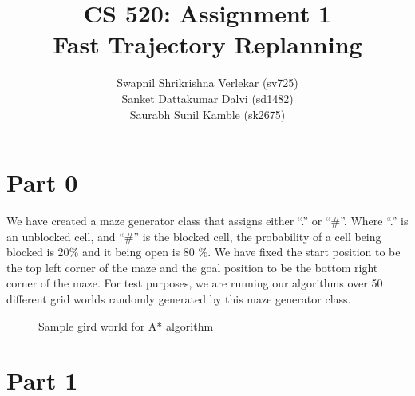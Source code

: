\documentclass{article}
\title{CS 520: Assignment 1 \\
\large Fast Trajectory Replanning}
\author{Swapnil Shrikrishna Verlekar (sv725)\\ Sanket Dattakumar Dalvi (sd1482)\\ Saurabh Sunil Kamble (sk2675)}
\begin{document}
\maketitle

\section*{Part 0}

We have created a maze generator class that assigns either “.” or “$\#$”. Where “.” is an unblocked cell, and “$\#$” is the blocked cell, the probability of a cell being blocked is 20$\%$ and it being open is 80 $\%$. We have fixed the start position to be the top left corner of the maze and the goal position to be the bottom right corner of the maze. For test purposes, we are running our algorithms over 50 different grid worlds randomly generated by this maze generator class.

\begin{figure}[!ht]
    \centering
    \caption{Sample gird world for A* algorithm}
    \label{fig:my_label}
\end{figure}

\section*{Part 1}
\end{document}
